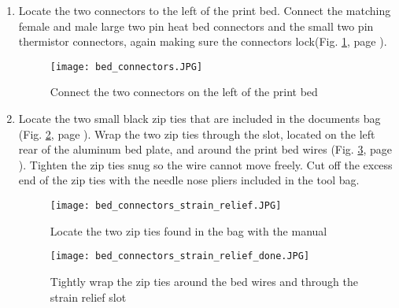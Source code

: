 \begin{enumerate}
\item Locate the two connectors to the left of the print bed. Connect the matching female and male large two pin heat bed connectors and the small two pin thermistor connectors, again making sure the connectors lock(Fig. \ref{fig:bed_connectors}, page \pageref{fig:bed_connectors}).

\begin{figure}[H]
\centering
\texttt{[image: bed\_connectors.JPG]}
\caption{Connect the two connectors on the left of the print bed}
\label{fig:bed_connectors}
\end{figure}

\item Locate the two small black zip ties that are included in the documents bag (Fig. \ref{fig:bed_connectors_strain_relief}, page \pageref{fig:bed_connectors_strain_relief}). Wrap the two zip ties through the slot, located on the left rear of the aluminum bed plate, and around the print bed wires (Fig. \ref{fig:bed_connectors_strain_relief_done}, page \pageref{fig:bed_connectors_strain_relief_done}). Tighten the zip ties snug so the wire cannot move freely. Cut off the excess end of the zip ties with the needle nose pliers included in the tool bag.

\begin{figure}[H]
\centering
\texttt{[image: bed\_connectors\_strain\_relief.JPG]}
\caption{Locate the two zip ties found in the bag with the manual}
\label{fig:bed_connectors_strain_relief}
\end{figure}

\begin{figure}[H]
\centering
\texttt{[image: bed\_connectors\_strain\_relief\_done.JPG]}
\caption{Tightly wrap the zip ties around the bed wires and through the strain relief slot}
\label{fig:bed_connectors_strain_relief_done}
\end{figure}


\end{enumerate}
